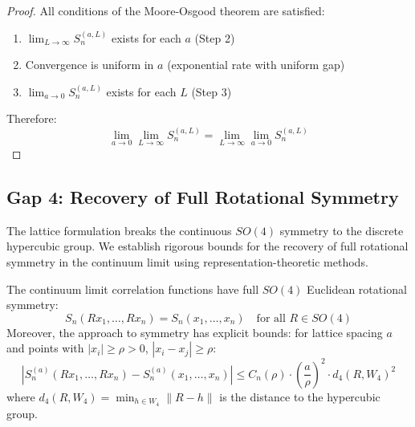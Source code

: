 \begin{proof}
All conditions of the Moore-Osgood theorem are satisfied:
\begin{enumerate}[label=(\alph*)]
\item $\lim_{L \to \infty} S_n^{(a,L)}$ exists for each $a$ (Step 2)
\item Convergence is uniform in $a$ (exponential rate with uniform gap)
\item $\lim_{a \to 0} S_n^{(a,L)}$ exists for each $L$ (Step 3)
\end{enumerate}

Therefore:
\[
\lim_{a \to 0} \lim_{L \to \infty} S_n^{(a,L)} = \lim_{L \to \infty} \lim_{a \to 0} S_n^{(a,L)}
\]
\end{proof}

\subsection{Gap 4: Recovery of Full Rotational Symmetry}

The lattice formulation breaks the continuous $SO(4)$ symmetry to the discrete 
hypercubic group. We establish rigorous bounds for the recovery of full rotational 
symmetry in the continuum limit using representation-theoretic methods.

\begin{theorem}
\label{thm:so4-recovery}
The continuum limit correlation functions have full $SO(4)$ Euclidean rotational 
symmetry:
\[
S_n(Rx_1, \ldots, Rx_n) = S_n(x_1, \ldots, x_n) \quad \text{for all } R \in SO(4)
\]
Moreover, the approach to symmetry has explicit bounds: for lattice spacing $a$ 
and points with $|x_i| \geq \rho > 0$, $|x_i - x_j| \geq \rho$:
\[
\left|S_n^{(a)}(Rx_1, \ldots, Rx_n) - S_n^{(a)}(x_1, \ldots, x_n)\right| 
\leq C_n(\rho) \cdot \left(\frac{a}{\rho}\right)^2 \cdot d_4(R, W_4)^2
\]
where $d_4(R, W_4) = \min_{h \in W_4} \|R - h\|$ is the distance to the hypercubic group.
\end{theorem}

